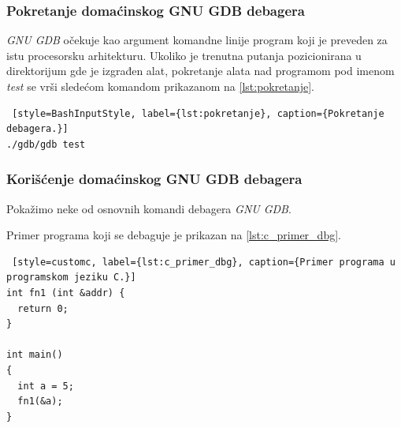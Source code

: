 \documentclass[12pt,oneside]{memoir}
\begin{document}
\subsubsection{Pokretanje domaćinskog GNU GDB debagera}

\emph{GNU GDB} očekuje kao argument komandne linije program koji je preveden za istu procesorsku arhitekturu. Ukoliko je trenutna putanja pozicionirana u direktorijum gde je izgrađen alat, pokretanje alata nad programom pod imenom \emph{test} se vrši sledećom komandom prikazanom na \ref{lst:pokretanje}.
\begin{lstlisting} [style=BashInputStyle, label={lst:pokretanje}, caption={Pokretanje debagera.}]
./gdb/gdb test

\end{lstlisting}


\subsubsection{Korišćenje domaćinskog GNU GDB debagera}

Pokažimo neke od osnovnih komandi debagera \emph{GNU GDB}.

Primer programa koji se debaguje je prikazan na \ref{lst:c_primer_dbg}.\newpage

\begin{lstlisting} [style=customc, label={lst:c_primer_dbg}, caption={Primer programa u programskom jeziku C.}]
int fn1 (int &addr) {
  return 0;
}

int main()
{
  int a = 5;
  fn1(&a);
}
\end{lstlisting}
\end{document}
